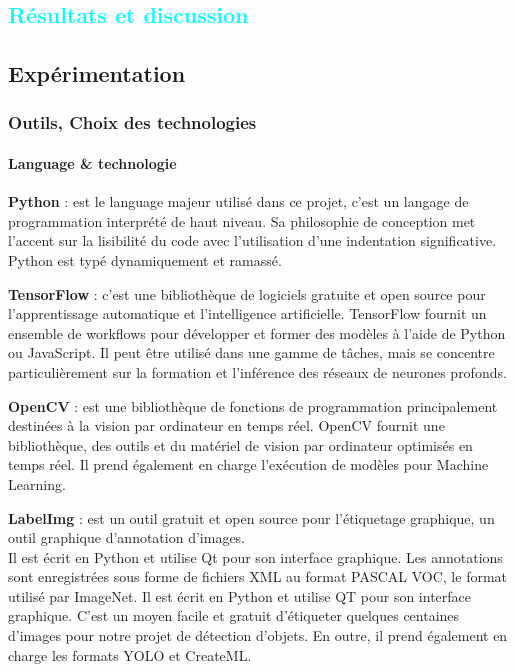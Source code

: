 
%
%

\textcolor{cyan}{\chapter{Résultats et discussion}}


\section{Expérimentation}

	


	\subsection{Outils, Choix des technologies}
	\subsubsection{Language \& technologie}
	\begin{list}{}{Le langage de programmation et technologie utilisée }
		\item \textbf{Python} : est le language majeur utilisé dans ce projet, c'est un langage de programmation interprété de haut niveau. Sa philosophie de conception met l'accent sur la lisibilité du code avec l'utilisation d'une indentation significative. Python est typé dynamiquement et ramassé.
		\item \textbf{TensorFlow} : c’est une bibliothèque de logiciels gratuite et open source pour l'apprentissage automatique et l'intelligence artificielle. TensorFlow fournit un ensemble de workflows pour développer et former des modèles à l'aide de Python ou JavaScript. Il peut être utilisé dans une gamme de tâches, mais se concentre particulièrement sur la formation et l'inférence des réseaux de neurones profonds.
		\item \textbf{OpenCV} : est une bibliothèque de fonctions de programmation principalement destinées à la vision par ordinateur en temps réel. OpenCV fournit une bibliothèque, des outils et du matériel de vision par ordinateur optimisés en temps réel. Il prend également en charge l'exécution de modèles pour Machine Learning.
		
		\item \textbf{LabelImg} : est un outil gratuit et open source pour l'étiquetage graphique, un outil graphique d'annotation d'images.\\
		Il est écrit en Python et utilise Qt pour son interface graphique. Les annotations sont enregistrées sous forme de fichiers XML au format PASCAL VOC, le format utilisé par ImageNet.
		Il est écrit en Python et utilise QT pour son interface graphique. C'est un moyen facile et gratuit d'étiqueter quelques centaines d'images pour notre projet de détection d'objets. En outre, il prend également en charge les formats YOLO et CreateML.
		
	\end{list}
	
